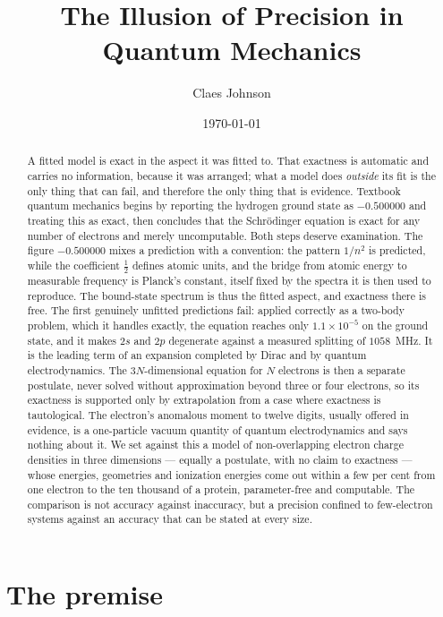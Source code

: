\documentclass[11pt]{article}
\title{The Illusion of Precision in Quantum Mechanics}
\author[1]{Claes Johnson}
\affil[1]{KTH Royal Institute of Technology, SE-100 44 Stockholm, Sweden \\
\small\texttt{claesjohnson@gmail.com}}
\date{\today}
\begin{document}
\maketitle

\begin{abstract}
A fitted model is exact in the aspect it was fitted to. That exactness is automatic and carries no
information, because it was arranged; what a model does \emph{outside} its fit is the only thing
that can fail, and therefore the only thing that is evidence. Textbook quantum mechanics begins by
reporting the hydrogen ground state as $-0.500000$ and treating this as exact, then concludes that
the Schr\"odinger equation is exact for any number of electrons and merely uncomputable. Both steps
deserve examination. The figure $-0.500000$ mixes a prediction with a convention: the pattern
$1/n^2$ is predicted, while the coefficient $\tfrac12$ defines atomic units, and the bridge from
atomic energy to measurable frequency is Planck's constant, itself fixed by the spectra it is then
used to reproduce. The bound-state spectrum is thus the fitted aspect, and exactness there is free.
The first genuinely unfitted predictions fail: applied correctly as a two-body problem, which it
handles exactly, the equation reaches only $1.1\times10^{-5}$ on the ground state, and it makes
$2s$ and $2p$ degenerate against a measured splitting of $1058$~MHz. It is the leading term of an
expansion completed by Dirac and by quantum electrodynamics. The $3N$-dimensional equation for $N$
electrons is then a separate postulate, never solved without approximation beyond three or four
electrons, so its exactness is supported only by extrapolation from a case where exactness is
tautological. The electron's anomalous moment to twelve digits, usually offered in evidence, is a
one-particle vacuum quantity of quantum electrodynamics and says nothing about it. We set against
this a model of non-overlapping electron charge densities in three dimensions --- equally a
postulate, with no claim to exactness --- whose energies, geometries and ionization energies come
out within a few per cent from one electron to the ten thousand of a protein, parameter-free and
computable. The comparison is not accuracy against inaccuracy, but a precision confined to
few-electron systems against an accuracy that can be stated at every size.
\end{abstract}

\section{The premise}\label{sec:premise}
\end{document}
